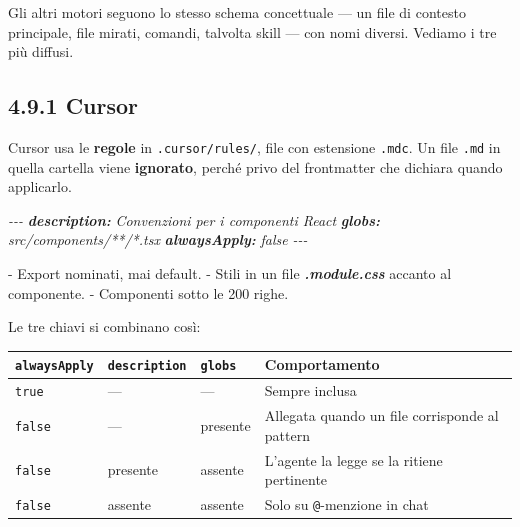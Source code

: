 \documentclass[
  italian,
  10pt,
]{book}
\newenvironment{Shaded}{\begin{snugshade}}{\end{snugshade}}
\newcommand{\AnnotationTok}[1]{\textcolor[rgb]{0.56,0.35,0.01}{\textbf{\textit{#1}}}}
\newcommand{\CommentTok}[1]{\textcolor[rgb]{0.56,0.35,0.01}{\textit{#1}}}
\newcommand{\InformationTok}[1]{\textcolor[rgb]{0.56,0.35,0.01}{\textbf{\textit{#1}}}}
\newcommand{\NormalTok}[1]{#1}
\newcommand{\SpecialStringTok}[1]{\textcolor[rgb]{0.31,0.60,0.02}{#1}}
\newcounter{none} %
\begin{document}
Gli altri motori seguono lo stesso schema concettuale --- un file di
contesto principale, file mirati, comandi, talvolta skill --- con nomi
diversi. Vediamo i tre più diffusi.

\subsection{4.9.1 Cursor}\label{cursor}

Cursor usa le \textbf{regole} in \texttt{.cursor/rules/}, file con
estensione \texttt{.mdc}. Un file \texttt{.md} in quella cartella viene
\textbf{ignorato}, perché privo del frontmatter che dichiara quando
applicarlo.

\begin{Shaded}
\begin{Highlighting}[]
\CommentTok{{-}{-}{-}}
\AnnotationTok{description:}\CommentTok{ Convenzioni per i componenti React}
\AnnotationTok{globs:}\CommentTok{ src/components/**/*.tsx}
\AnnotationTok{alwaysApply:}\CommentTok{ false}
\CommentTok{{-}{-}{-}}

\SpecialStringTok{{-} }\NormalTok{Export nominati, mai default.}
\SpecialStringTok{{-} }\NormalTok{Stili in un file }\InformationTok{\textasciigrave{}.module.css\textasciigrave{}}\NormalTok{ accanto al componente.}
\SpecialStringTok{{-} }\NormalTok{Componenti sotto le 200 righe.}
\end{Highlighting}
\end{Shaded}

Le tre chiavi si combinano così:

{\def\LTcaptype{none} %
\begin{longtable}[]{@{}
  >{\raggedright\arraybackslash}p{}
  >{\raggedright\arraybackslash}p{}
  >{\raggedright\arraybackslash}p{}
  >{\raggedright\arraybackslash}p{}@{}}
\toprule\noalign{}
\begin{minipage}[b]{\linewidth}\raggedright
\texttt{alwaysApply}
\end{minipage} & \begin{minipage}[b]{\linewidth}\raggedright
\texttt{description}
\end{minipage} & \begin{minipage}[b]{\linewidth}\raggedright
\texttt{globs}
\end{minipage} & \begin{minipage}[b]{\linewidth}\raggedright
Comportamento
\end{minipage} \\
\midrule\noalign{}
\endhead
\bottomrule\noalign{}
\endlastfoot
\texttt{true} & --- & --- & Sempre inclusa \\
\texttt{false} & --- & presente & Allegata quando un file corrisponde al
pattern \\
\texttt{false} & presente & assente & L'agente la legge se la ritiene
pertinente \\
\texttt{false} & assente & assente & Solo su \texttt{@}-menzione in
chat \\
\end{longtable}
}
\end{document}
